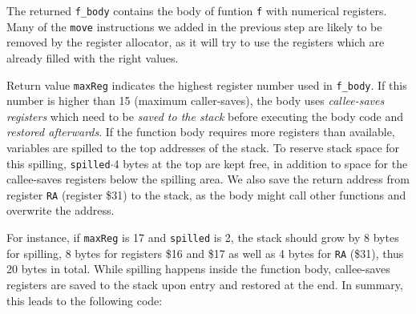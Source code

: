 \documentclass[11pt,a4paper]{article}
\newcommand{\codesize}{\scriptsize}
\newcommand{\cd}[1]{{{\codesize\tt #1}}}
\begin{document}
The returned \cd{f\_body} contains the body of funtion \cd{f} with numerical
registers. Many of the \cd{move} instructions we added in the previous step
are likely to be removed by the register allocator, as it will try to use 
the registers which are already filled with the right values.

Return value \cd{maxReg} indicates the highest register number used in 
\cd{f\_body}. If this number is higher than 15 (maximum caller-saves),
the body uses \emph{callee-saves registers} which need to be 
\emph{saved to the stack} before executing the body code and 
\emph{restored afterwards}.
If the function body requires more registers than available, variables are
spilled to the top addresses of the stack. To reserve stack space for this
spilling, \cd{spilled}$\cdot$4 bytes at the top are kept free,
in addition to space for the callee-saves registers below the spilling area.
We also save the return address from register \cd{RA} (register \$31) to the 
stack, as the body might call other functions and overwrite the address.

For instance, if \cd{maxReg} is 17 and \cd{spilled} is 2, the stack should grow by
8 bytes for spilling, 8 bytes for registers \$16 and \$17 as well as 4 bytes for 
\cd{RA} (\$31), thus 20 bytes in total. 
While spilling happens inside the function body, callee-saves registers are saved 
to the stack upon entry and restored at the end.
In summary, this leads to the following code:
\end{document}
